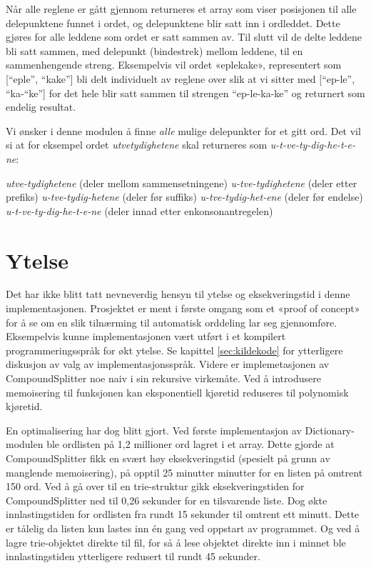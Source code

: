 Når alle reglene er gått gjennom returneres et array som viser posisjonen til alle delepunktene funnet i ordet, og delepunktene blir satt inn i ordleddet. Dette gjøres for alle leddene som ordet er satt sammen av. Til slutt vil de delte leddene bli satt sammen, med delepunkt (bindestrek) mellom leddene, til en sammenhengende streng. Eksempelvis vil ordet «eplekake», representert som [“eple”, “kake”] bli delt individuelt av reglene over slik at vi sitter med [“ep-le”, “ka-“ke”] for det hele blir satt sammen til strengen “ep-le-ka-ke” og returnert som endelig resultat.

Vi ønsker i denne modulen å finne \textit{alle} mulige delepunkter for et gitt ord. Det vil si at for eksempel ordet \textit{utvetydighetene} skal returneres som \textit{u-t-ve-ty-dig-he-t-e-ne}:

\textit{utve-tydighetene} (deler mellom sammensetningene)\newline
\textit{u-tve-tydighetene} (deler etter prefiks)\newline
\textit{u-tve-tydig-hetene} (deler før suffiks)\newline
\textit{u-tve-tydig-het-ene} (deler før endelse)\newline
\textit{u-t-ve-ty-dig-he-t-e-ne} (deler innad etter enkonsonantregelen)


\section{Ytelse}

Det har ikke blitt tatt nevneverdig hensyn til ytelse og eksekveringstid i denne implementasjonen. Prosjektet er ment i første omgang som et «proof of concept» for å se om en slik tilnærming til automatisk orddeling lar seg gjennomføre. Eksempelvis kunne implementasjonen vært utført i et kompilert programmeringsspråk for økt ytelse. Se kapittel \ref{sec:kildekode} for ytterligere diskusjon av valg av implementasjonsspråk. Videre er implemetasjonen av CompoundSplitter noe naiv i sin rekursive virkemåte. Ved å introdusere memoisering til funksjonen kan eksponentiell kjøretid reduseres til polynomisk kjøretid.

En optimalisering har dog blitt gjort. Ved første implementasjon av Dictionary-modulen ble ordlisten på 1,2 millioner ord lagret i et array. Dette gjorde at CompoundSplitter fikk en svært høy eksekveringstid (spesielt på grunn av manglende memoisering), på opptil 25 minutter minutter for en listen på omtrent 150 ord. Ved å gå over til en trie-struktur gikk eksekveringstiden for CompoundSplitter ned til 0,26 sekunder for en tilsvarende liste. Dog økte innlastingstiden for ordlisten fra rundt 15 sekunder til omtrent ett minutt. Dette er tålelig da listen kun lastes inn én gang ved oppstart av programmet. Og ved å lagre trie-objektet direkte til fil, for så å lese objektet direkte inn i minnet ble innlastingstiden ytterligere redusert til rundt 45 sekunder.


